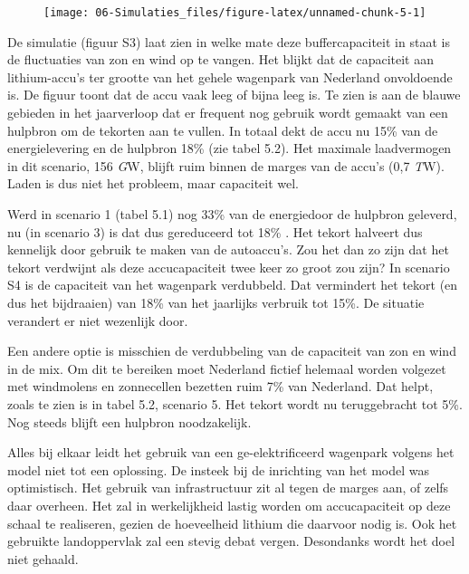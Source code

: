\documentclass[
  11pt,
  a4paper,
]{book}
\begin{document}
\begin{figure}

{\centering \texttt{[image: 06-Simulaties\_files/figure-latex/unnamed-chunk-5-1]} 

}

\end{figure}

De simulatie (figuur S3) laat zien in welke mate deze buffercapaciteit in staat is de fluctuaties van zon en wind op te vangen. Het blijkt dat de capaciteit aan lithium-accu's ter grootte van het gehele wagenpark van Nederland onvoldoende is. De figuur toont dat de accu vaak leeg of bijna leeg is. Te zien is aan de blauwe gebieden in het jaarverloop dat er frequent nog gebruik wordt gemaakt van een hulpbron om de tekorten aan te vullen. In totaal dekt de accu nu 15\% van de energielevering en de hulpbron 18\% (zie tabel 5.2). Het maximale laadvermogen in dit scenario, 156 \emph{G}W, blijft ruim binnen de marges van de accu's (0,7 \emph{T}W). Laden is dus niet het probleem, maar capaciteit wel.

Werd in scenario 1 (tabel 5.1) nog 33\% van de energiedoor de hulpbron geleverd, nu (in scenario 3) is dat dus gereduceerd tot 18\% . Het tekort halveert dus kennelijk door gebruik te maken van de autoaccu's. Zou het dan zo zijn dat het tekort verdwijnt als deze accucapaciteit twee keer zo groot zou zijn? In scenario S4 is de capaciteit van het wagenpark verdubbeld. Dat vermindert het tekort (en dus het bijdraaien) van 18\% van het jaarlijks verbruik tot 15\%. De situatie verandert er niet wezenlijk door.

Een andere optie is misschien de verdubbeling van de capaciteit van zon en wind in de mix. Om dit te bereiken moet Nederland fictief helemaal worden volgezet met windmolens en zonnecellen bezetten ruim 7\% van Nederland. Dat helpt, zoals te zien is in tabel 5.2, scenario 5. Het tekort wordt nu teruggebracht tot 5\%. Nog steeds blijft een hulpbron noodzakelijk.

Alles bij elkaar leidt het gebruik van een ge-elektrificeerd wagenpark volgens het model niet tot een oplossing. De insteek bij de inrichting van het model was optimistisch. Het gebruik van infrastructuur zit al tegen de marges aan, of zelfs daar overheen. Het zal in werkelijkheid lastig worden om accucapaciteit op deze schaal te realiseren, gezien de hoeveelheid lithium die daarvoor nodig is. Ook het gebruikte landoppervlak zal een stevig debat vergen. Desondanks wordt het doel niet gehaald.
\end{document}
